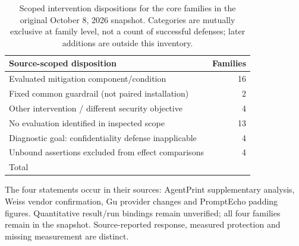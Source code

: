 \begin{table}[t]\centering\footnotesize
\caption{Scoped intervention dispositions for the \SnapshotCore{} core families in the original October 8, 2026 snapshot. Categories are mutually exclusive at family level, not a count of successful defenses; later additions are outside this inventory.}\label{tab:intervention-status}
\begin{tabularx}{\columnwidth}{@{}Yr@{}}\toprule
Source-scoped disposition & Families\\\midrule
Evaluated mitigation component/condition & 16\\
Fixed common guardrail (not paired installation) & 2\\
Other intervention / different security objective & 4\\
No evaluation identified in inspected scope & 13\\
Diagnostic goal: confidentiality defense inapplicable & 4\\
Unbound assertions excluded from effect comparisons & 4\\\midrule
Total & \SnapshotCore{}\\\bottomrule
\end{tabularx}
\par\smallskip\raggedright\footnotesize
The four statements occur in their sources: AgentPrint supplementary analysis, Weiss vendor confirmation, Gu provider changes and PromptEcho padding figures. Quantitative result/run bindings remain unverified; all four families remain in the snapshot. Source-reported response, measured protection and missing measurement are distinct.
\end{table}
